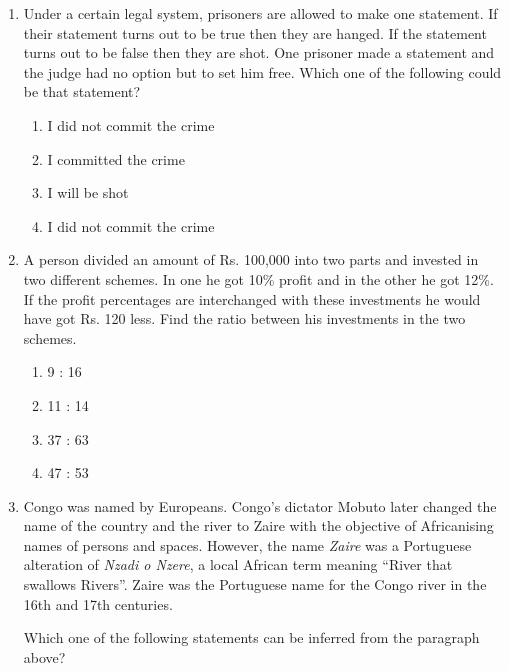 \documentclass[12pt]{article}
\begin{document}
\begin{enumerate}[label=Q.\arabic*]
\item Under a certain legal system, prisoners are allowed to make one statement. If their statement turns out to be true then they are hanged. If the statement turns out to be false then they are shot. One prisoner made a statement and the judge had no option but to set him free. Which one of the following could be that statement?
\begin{enumerate}
\item I did not commit the crime 
\item I committed the crime 
\item  I will be shot 
\item  I did not commit the crime
\end{enumerate}


\item A person divided an amount of Rs. 100,000 into two parts and invested in two different schemes. In one he got 10\% profit and in the other he got 12\%. If the profit percentages are interchanged with these investments he would have got Rs. 120 less. Find the ratio between his investments in the two schemes.

\begin{enumerate}[label=(\Alph*)]
\item 9 : 16
\item 11 : 14
\item 37 : 63
\item 47 : 53
\end{enumerate}

\item Congo was named by Europeans. Congo’s dictator Mobuto later changed the name of the country and the river to Zaire with the objective of Africanising names of persons and spaces. However, the name \emph{Zaire} was a Portuguese alteration of \emph{Nzadi o Nzere}, a local African term meaning ``River that swallows Rivers''. Zaire was the Portuguese name for the Congo river in the 16th and 17th centuries.

Which one of the following statements can be inferred from the paragraph above?


\end{enumerate}
\end{document}
